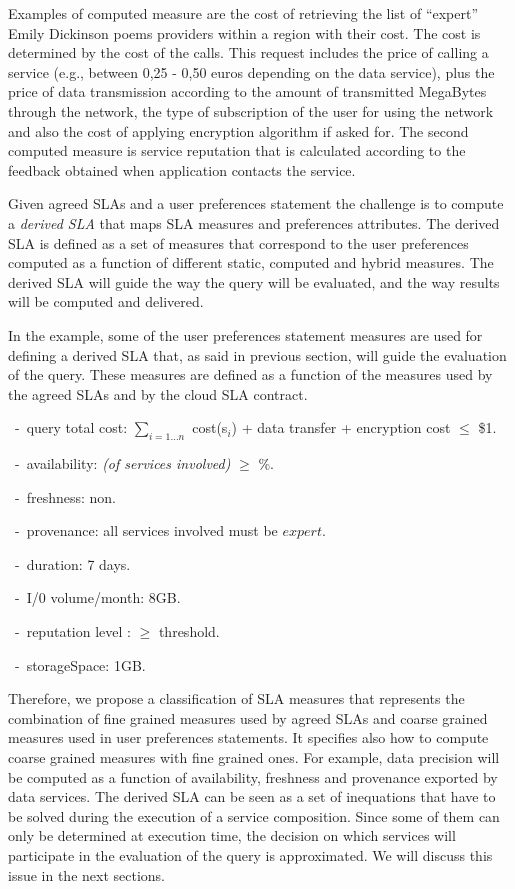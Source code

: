 Examples of computed measure are the cost of retrieving the list of ``expert'' Emily Dickinson poems providers within a region with their cost. 
The cost is determined by the  cost of the calls. 
This request  includes the price of calling a service (e.g.,  between 0,25 - 0,50 euros depending on the data service), plus the price of data transmission according to the amount of transmitted MegaBytes through the network, the type of subscription of the user for using the network and also the cost of applying encryption algorithm if asked for. The second computed measure is service reputation that is calculated according to the feedback obtained when application contacts the service.

Given agreed SLAs and a user preferences statement the challenge is to compute a  {\em derived SLA} that  maps SLA measures and preferences attributes.  
The derived SLA is defined as a set of measures that correspond to the user preferences computed as a function of different static, computed and hybrid measures. 
The derived SLA  will guide the way the query will be evaluated, and the way results will be computed and delivered.

In the example, some of the user preferences statement measures are used for defining a derived SLA that, as said in previous section, will guide the evaluation of the query. 
These measures are defined as a function of the measures used by the agreed SLAs and by the cloud SLA contract.
\begin{trivlist}\sf\footnotesize
 \item[~-~query total cost:] $\sum_{i = 1\dots n}$ cost(s$_i$) + data transfer + encryption cost $\leq$ \$1.
 \item[~-~availability:] {\em (of services involved)} $\geq$ {$\%$}.
 \item[~-~freshness:] non.
 \item[~-~provenance:] all services involved must be $expert$.
 \item[~-~duration:] 7 days.
 \item[~-~I/0 volume/month:] 8GB.
 \item[~-~reputation level :] $\geq$ threshold.
 \item[~-~storageSpace:] 1GB.
 \end{trivlist} 
 
Therefore, we propose a classification of SLA measures that represents the combination of fine grained measures used by agreed SLAs and coarse grained measures used in user preferences statements. 
It specifies also how to compute coarse grained measures with fine grained ones. 
For example, data precision will be computed as a function of availability, freshness and provenance exported by data services. The derived SLA can be seen as a set of inequations that have to be solved during the execution of a service composition. Since some of them can only be determined at execution time, the decision on which services will participate in the evaluation of the query is approximated. We will discuss this issue in the next sections.

